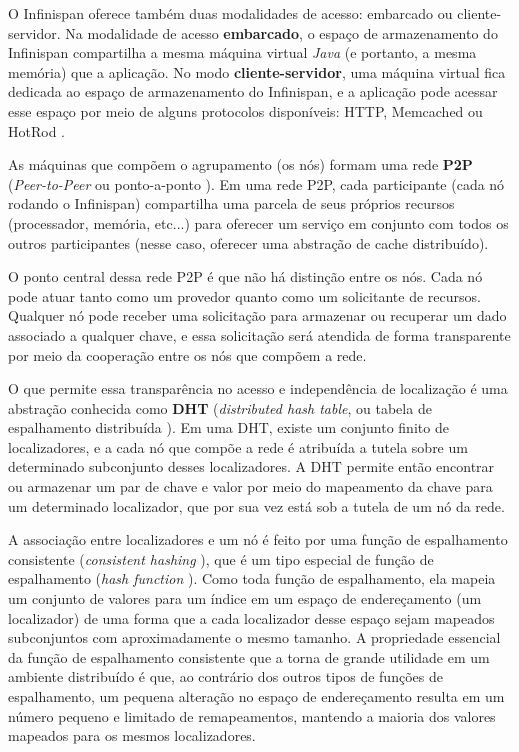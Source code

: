 \documentclass[11pt,twoside,a4paper]{book}
\begin{document}
O Infinispan oferece também duas modalidades de acesso: embarcado ou cliente-servidor. Na modalidade de acesso \textbf{embarcado}, o espaço de armazenamento do Infinispan compartilha a mesma máquina virtual \emph{Java} (e portanto, a mesma memória) que a aplicação. No modo \textbf{cliente-servidor}, uma máquina virtual fica dedicada ao espaço de armazenamento do Infinispan, e a aplicação pode acessar esse espaço por meio de alguns protocolos disponíveis: HTTP, Memcached ou HotRod \cite{infinispan}.

As máquinas que compõem o agrupamento (os nós) formam uma rede \textbf{P2P} (\emph{Peer-to-Peer} ou ponto-a-ponto \cite{p2p}). Em uma rede P2P, cada participante (cada nó rodando o Infinispan) compartilha uma parcela de seus próprios recursos (processador, memória, etc...) para oferecer um serviço em conjunto com todos os outros participantes (nesse caso, oferecer uma abstração de cache distribuído).

O ponto central dessa rede P2P é que não há distinção entre os nós. Cada nó pode atuar tanto como um provedor quanto como um solicitante de recursos. Qualquer nó pode receber uma solicitação para armazenar ou recuperar um dado associado a qualquer chave, e essa solicitação será atendida de forma transparente por meio da cooperação entre os nós que compõem a rede.

O que permite essa transparência no acesso e independência de localização é uma abstração conhecida como \textbf{DHT} (\emph{distributed hash table}, ou tabela de espalhamento distribuída \cite{dht}). Em uma DHT, existe um conjunto finito de localizadores, e a cada nó que compõe a rede é atribuída a tutela sobre um determinado subconjunto desses localizadores. A DHT permite então encontrar ou armazenar um par de chave e valor por meio do mapeamento da chave para um determinado localizador, que por sua vez está sob a tutela de um nó da rede.

A associação entre localizadores e um nó é feito por uma função de espalhamento consistente (\emph{consistent hashing} \cite{consistent_hashing}), que é um tipo especial de função de espalhamento (\emph{hash function} \cite{taocp_3}). Como toda função de espalhamento, ela mapeia um conjunto de valores para um índice em um espaço de endereçamento (um localizador) de uma forma que a cada localizador desse espaço sejam mapeados subconjuntos com aproximadamente o mesmo tamanho. A propriedade essencial da função de espalhamento consistente que a torna de grande utilidade em um ambiente distribuído é que, ao contrário dos outros tipos de funções de espalhamento, um pequena alteração no espaço de endereçamento resulta em um número pequeno e limitado de remapeamentos, mantendo a maioria dos valores mapeados para os mesmos localizadores.
\end{document}

